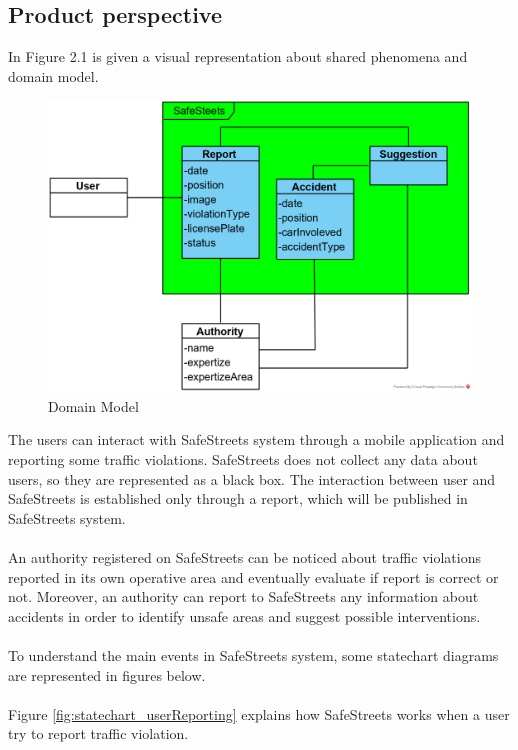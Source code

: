 \documentclass{article}
\begin{document}
	\subsection{Product perspective}
	In Figure 2.1 is given a visual representation about shared phenomena and domain model. 
	\begin{figure}[ht]
		\centering
		\includegraphics {diagrams/domain_model.png}
		\caption[Domain Model]{Domain Model}
		\label{fig:domain_model}
	\end{figure}
	
	The users can interact with SafeStreets system through a mobile application and reporting some traffic violations.
	SafeStreets does not collect any data about users, so they are represented as a black box. The interaction between user and SafeStreets is established only through 
	a report, which will be published in SafeStreets system.\\\\
	An authority registered on SafeStreets can be noticed about traffic violations reported in its own operative area and eventually evaluate if report is correct or not. Moreover, an authority can report to SafeStreets any information about accidents in order to identify unsafe areas and suggest possible interventions.\\\\
	To understand the main events in SafeStreets system, some statechart diagrams are represented in figures below. \\\\
	\clearpage
	Figure \ref{fig:statechart_userReporting} explains how SafeStreets works when a user try to report traffic violation.
	
\end{document}
